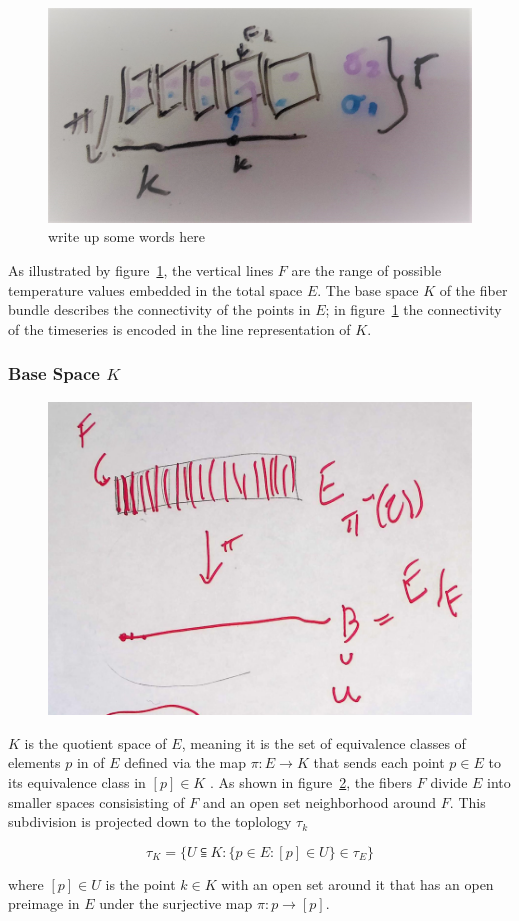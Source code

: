 \documentclass[../main.tex]{subfiles}
\begin{document}
\begin{figure}[ht]
    \label{fig:fiberbundle}
    \includegraphics[width=.2\linewidth]{figures/sections/math/fiberbundle.png}
    \caption{write up some words here}
\end{figure}

As illustrated by figure~\ref{fig:fiberbundle}, the vertical lines $F$ are the range of possible temperature values embedded in the total space $E$. The base space $K$ of the fiber bundle describes the connectivity of the points in $E$; in figure~\ref{fig:fiberbundle} the connectivity of the timeseries is encoded in the line representation of $K$. 

\subsubsection{Base Space $K$}

\begin{figure}[ht]
    \includegraphics[width=0.4\linewidth]{figures/sections/math/k_qspace.png}
    \label{fig:kquotient}
\end{figure}

$K$ is the quotient space of $E$, meaning it is the set of equivalence classes of elements $p$ in of $E$ defined via the map $\pi: E \rightarrow K$ that sends each point $p \in E$ to its equivalence class in $[p] \in K$ \cite{QuotientSpaceTopology2020,QuotientSpaceTopology2020}. As shown in figure~\ref{fig:kquotient}, the fibers $F$ divide $E$ into smaller spaces consisisting of $F$ and an open set neighborhood around $F$. This subdivision is projected down to the toplology $\tau_k$

\begin{equation}
\tau_K = \{U\subseteqq K: \{p \in E: [p] \in U\}\in \tau_E\}
\end{equation}

where $[p] \in U$ is the point $k \in K$ with an open set around it that has an open  preimage in $E$ under the surjective map $\pi: p \rightarrow [p]$. 
\end{document}
